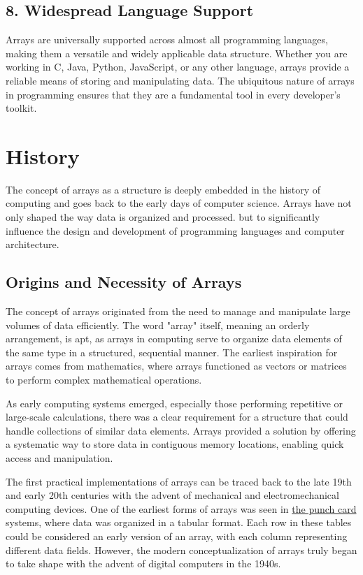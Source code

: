 \documentclass{book}
\begin{document}
\subsection{8. Widespread Language Support}

Arrays are universally supported across almost all programming languages, making them a versatile and widely applicable data structure. Whether you are working in C, Java, Python, JavaScript, or any other language, arrays provide a reliable means of storing and manipulating data. The ubiquitous nature of arrays in programming ensures that they are a fundamental tool in every developer's toolkit.

\section{History}
	
	The concept of arrays as a structure is deeply embedded in the history of computing and goes back to the early days of computer science. Arrays have not only shaped the way data is organized and processed. but to significantly influence the design and development of programming languages ​​and computer architecture.
	
	\subsection{Origins and Necessity of Arrays}
	
	The concept of arrays originated from the need to manage and manipulate large volumes of data efficiently. The word "array" itself, meaning an orderly arrangement, is apt, as arrays in computing serve to organize data elements of the same type in a structured, sequential manner. The earliest inspiration for arrays comes from mathematics, where arrays functioned as vectors or matrices to perform complex mathematical operations. 
	
	As early computing systems emerged, especially those performing repetitive or large-scale calculations, there was a clear requirement for a structure that could handle collections of similar data elements. Arrays provided a solution by offering a systematic way to store data in contiguous memory locations, enabling quick access and manipulation.
	
	The first practical implementations of arrays can be traced back to the late 19th and early 20th centuries with the advent of mechanical and electromechanical computing devices. One of the earliest forms of arrays was seen in \href{https://en.wikipedia.org/wiki/Punched_card}{the punch card} systems, where data was organized in a tabular format. Each row in these tables could be considered an early version of an array, with each column representing different data fields. However, the modern conceptualization of arrays truly began to take shape with the advent of digital computers in the 1940s.
	
\end{document}
